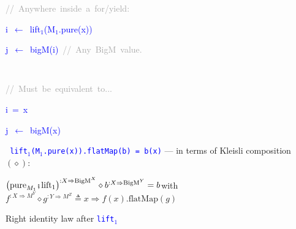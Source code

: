{\footnotesize{}\vspace{-0.3cm}\hspace{-0.0cm}}\texttt{\textcolor{blue}{\footnotesize{}}}%
\begin{minipage}[t]{0.54\columnwidth}%
\begin{lyxcode}
\textrm{\textcolor{darkgray}{\footnotesize{}//~Anywhere~inside~a~for/yield:}}{\footnotesize\par}

\textcolor{blue}{\footnotesize{}i~$\leftarrow$~lift$_{1}$(M$_{1}$.pure(x))}{\footnotesize\par}

\textcolor{blue}{\footnotesize{}j~$\leftarrow$~bigM(i)~}\textrm{\textcolor{darkgray}{\footnotesize{}//~Any~BigM~value.}}{\footnotesize\par}
\end{lyxcode}
%
\end{minipage}\texttt{\textcolor{blue}{\footnotesize{}~ }}%
\begin{minipage}[t]{0.54\columnwidth}%
\begin{lyxcode}
\textrm{\textcolor{darkgray}{\footnotesize{}//~Must~be~equivalent~to...}}{\footnotesize\par}

\textcolor{blue}{\footnotesize{}i~=~x}{\footnotesize\par}

\textcolor{blue}{\footnotesize{}j~$\leftarrow$~bigM(x)}{\footnotesize\par}
\end{lyxcode}
%
\end{minipage}\texttt{\textcolor{blue}{\footnotesize{}\smallskip{}
lift$_{1}$(M$_{1}$.pure(x)).flatMap(b) = b(x)}} — in terms of Kleisli
composition $\left(\diamond\right)$:
\begin{center}
{\footnotesize{}\vspace{-0.2cm}\hspace{-0.0cm}$\left(\text{pure}_{M_{1}}\bef\text{lift}_{1}\right)^{:X\Rightarrow\text{BigM}^{X}}\diamond b^{:X\Rightarrow\text{BigM}^{Y}}=b$\hspace*{\fill}with
$f^{:X\Rightarrow M^{Y}}\diamond g^{:Y\Rightarrow M^{Z}}\triangleq x\Rightarrow f(x).\text{flatMap}(g)$}{\footnotesize\par}
\par\end{center}

{\footnotesize{}\vspace{-0.2cm}\hspace{-0.0cm}}Right identity law
after \texttt{\textcolor{blue}{\footnotesize{}lift$_{1}$}} 

